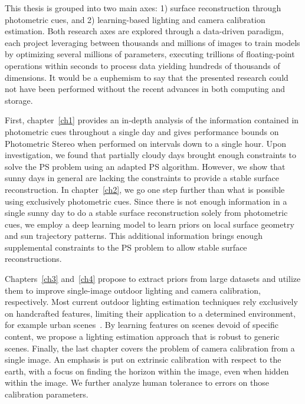 This thesis is grouped into two main axes: 1) surface reconstruction through photometric cues, and 2) learning-based lighting and camera calibration estimation. Both research axes are explored through a data-driven paradigm, each project leveraging between thousands and millions of images to train models by optimizing several millions of parameters, executing trillions of floating-point operations within seconds to process data yielding hundreds of thousands of dimensions. It would be a euphemism to say that the presented research could not have been performed without the recent advances in both computing and storage.

First, chapter~\ref{ch1} provides an in-depth analysis of the information contained in photometric cues throughout a single day and gives performance bounds on Photometric Stereo when performed on intervals down to a single hour. Upon investigation, we found that partially cloudy days brought enough constraints to solve the PS problem using an adapted PS algorithm. However, we show that sunny days in general are lacking the constraints to provide a stable surface reconstruction. In chapter~\ref{ch2}, we go one step further than what is possible using exclusively photometric cues. Since there is not enough information in a single sunny day to do a stable surface reconstruction solely from photometric cues, we employ a deep learning model to learn priors on local surface geometry and sun trajectory patterns. This additional information brings enough supplemental constraints to the PS problem to allow stable surface reconstructions.

Chapters~\ref{ch3} and~\ref{ch4} propose to extract priors from large datasets and utilize them to improve single-image outdoor lighting and camera calibration, respectively. Most current outdoor lighting estimation techniques rely exclusively on handcrafted features, limiting their application to a determined environment, for example urban scenes~\cite{lalonde-ijcv-12}. By learning features on scenes devoid of specific content, we propose a lighting estimation approach that is robust to generic scenes. Finally, the last chapter covers the problem of camera calibration from a single image. An emphasis is put on extrinsic calibration with respect to the earth, with a focus on finding the horizon within the image, even when hidden within the image. We further analyze human tolerance to errors on those calibration parameters.



%
%

